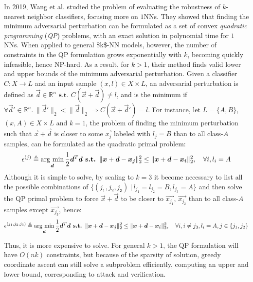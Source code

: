 In 2019, Wang et al. \cite{Wang19} studied the problem of evaluating the robustness of $k$-nearest neighbor classifiers, focusing more on $1$NNs. They showed that finding the minimum adversarial perturbation can be formulated as a set of convex \emph{quadratic programming} (\emph{\acs{QP}}) problems, with an exact solution in polynomial time for $1$NNs. When applied to general \acs{$k$-NN} models, however, the number of constraints in the \acs{QP} formulation grows exponentially with $k$, becoming quickly infeasible, hence NP-hard. As a result, for $k > 1$, their method finds valid lower and upper bounds of the minimum adversarial perturbation. Given a classifier $C\colon X \rightarrow L$ and an input sample $(x, l) \in X \times L$, an adversarial perturbation is defined as $\vec{d} \in \mathbb{R}^n \textbf{ s.t. } C(\vec{x} + \vec{d}) \neq l$, and is the minimum if $\forall \vec{d}' \in \mathbb{R}^n.\: \lVert \vec{d}' \rVert_2 < \lVert \vec{d} \rVert_2 \Rightarrow C(\vec{x} + \vec{d}') = l$. For instance, let $L = \{A, B\}$, $(x, A) \in X \times L$ and $k = 1$, the problem of finding the minimum perturbation such that $\vec{x} + \vec{d}$ is closer to some $\vec{x_j}$ labeled with $l_j = B$ than to all class-$A$ samples, can be formulated as the quadratic primal problem:
\begin{equation*}
	\epsilon^{(j)} \triangleq \operatorname*{\arg\,\min}\limits_{\bm{d}} \frac{1}{2}\bm{d}^T\bm{d} \textbf{ s.t. } \lVert \bm{x} + \bm{d} - \bm{x_j} \rVert_2^2 \leq  \lVert \bm{x} + \bm{d} - \bm{x_i} \rVert_2^2, ~~~ \forall i,l_i = A
\end{equation*}
Although it is simple to solve, by scaling to $k = 3$ it become necessary to list all the possible combinations of $\{(j_1, j_2, j_3) ~|~ l_{j_1} = l_{j_2} = B, l_{j_3} = A\}$ and then solve the \acs{QP} primal problem to force $\vec{x} + \vec{d}$ to be closer to $\vec{x_{j_1}}$, $\vec{x_{j_2}}$ than to all class-$A$ samples except $\vec{x_{j_3}}$, hence:
\begin{equation*}
	\epsilon^{(j_1,j_2,j_3)} \triangleq \operatorname*{\arg\,\min}\limits_{\bm{d}} \frac{1}{2}\bm{d}^T\bm{d} \textbf{ s.t. } \lVert \bm{x} + \bm{d} - \bm{x_j} \rVert_2^2 \leq  \lVert \bm{x} + \bm{d} - \bm{x_i} \rVert_2^2, ~~~ \forall i, i \neq j_3, l_i = A, j \in \{j_1, j_2\}
\end{equation*}

Thus, it is more expensive to solve. For general $k > 1$, the \acs{QP} formulation will have $O(nk)$ constraints, but because of the sparsity of solution, greedy coordinate ascent can still solve a subproblem efficiently, computing an upper and lower bound, corresponding to attack and verification.

